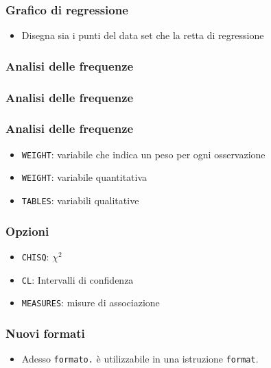 \begin{frame}[containsverbatim]\frametitle{Grafico di regressione}
  \begin{itemize}
  \item
    Disegna sia i punti del data set che la retta di regressione
  \end{itemize}
\end{frame}




\begin{frame}[containsverbatim]\frametitle{Analisi delle frequenze}
\end{frame}


\begin{frame}[containsverbatim]\frametitle{Analisi delle frequenze}
\end{frame}

\begin{frame}[containsverbatim]\frametitle{Analisi delle frequenze}
  \begin{itemize}
  \item
    \verb+WEIGHT+: variabile che indica un peso per ogni osservazione
  \item
    \verb+WEIGHT+: variabile quantitativa
  \item
    \verb+TABLES+: variabili qualitative
  \end{itemize}
\end{frame}


\begin{frame}[containsverbatim]\frametitle{Opzioni}
  \begin{itemize}
  \item
    \verb+CHISQ+: $\chi^2$
  \item
    \verb+CL+: Intervalli di confidenza
  \item
    \verb+MEASURES+: misure di associazione
  \end{itemize}
\end{frame}




\begin{frame}[containsverbatim]\frametitle{Nuovi formati}
  \begin{itemize}
  \item
    Adesso \texttt{formato.} {\`e} utilizzabile in una istruzione  \texttt{format}.
  \end{itemize}
\end{frame}

